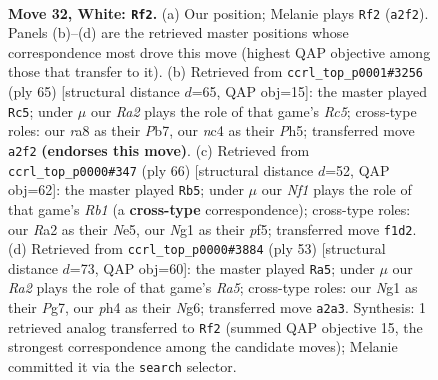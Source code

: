 \documentclass[11pt]{article}
\begin{document}
\clearpage

\begin{figure}[p]\centering
\begin{subfigure}{0.46\textwidth}\centering
\resizebox{\linewidth}{!}{%
\newchessgame
\chessboard[
  setfen={r1b1k3/8/8/1P4r1/p1n1pp1p/3p3P/R5PR/K4NN1 w q - 0 32},
  showmover=false,
  pgfstyle=straightmove, color=movearrow, markmove={a2-f2}
]}
\caption{}
\end{subfigure}\hfill
\begin{subfigure}{0.46\textwidth}\centering
\resizebox{\linewidth}{!}{%
\newchessgame
\chessboard[
  setfen={8/1pk5/3r2p1/p2p2Pp/2r1nP1P/P3R3/1P6/1K1R1B2 b - - 2 33},
  showmover=false,
  pgfstyle=straightmove, color=movearrow, markmove={c4-c5}
]}
\caption{}
\end{subfigure}
\\[4pt]
\begin{subfigure}{0.46\textwidth}\centering
\resizebox{\linewidth}{!}{%
\newchessgame
\chessboard[
  setfen={8/2p1k3/1n6/2p1Np2/r1P3p1/p3P1P1/P3KP1r/1RR5 w - - 0 34},
  showmover=false,
  pgfstyle=straightmove, color=movearrow, markmove={b1-b5}
]}
\caption{}
\end{subfigure}\hfill
\begin{subfigure}{0.46\textwidth}\centering
\resizebox{\linewidth}{!}{%
\newchessgame
\chessboard[
  setfen={5rk1/p5p1/3P2n1/3p4/r6p/2P2NbP/P5P1/K2R2BR b - - 0 27},
  showmover=false,
  pgfstyle=straightmove, color=movearrow, markmove={a4-a5}
]}
\caption{}
\end{subfigure}
\caption{\textbf{Move 32, White: \texttt{Rf2}.} (a) Our position; Melanie plays \texttt{Rf2} (\texttt{a2f2}). Panels (b)--(d) are the retrieved master positions whose correspondence most drove this move (highest QAP objective among those that transfer to it). (b) Retrieved from \texttt{ccrl\_top\_p0001\#3256} (ply 65) [structural distance $d$=65, QAP obj=15]: the master played \texttt{Rc5}; under $\mu$ our \emph{Ra2} plays the role of that game's \emph{Rc5}; cross-type roles: our \emph{r}a8 as their \emph{P}b7, our \emph{n}c4 as their \emph{P}h5; transferred move \texttt{a2f2} \textbf{(endorses this move)}. (c) Retrieved from \texttt{ccrl\_top\_p0000\#347} (ply 66) [structural distance $d$=52, QAP obj=62]: the master played \texttt{Rb5}; under $\mu$ our \emph{Nf1} plays the role of that game's \emph{Rb1} (a \textbf{cross-type} correspondence); cross-type roles: our \emph{R}a2 as their \emph{N}e5, our \emph{N}g1 as their \emph{p}f5; transferred move \texttt{f1d2}. (d) Retrieved from \texttt{ccrl\_top\_p0000\#3884} (ply 53) [structural distance $d$=73, QAP obj=60]: the master played \texttt{Ra5}; under $\mu$ our \emph{Ra2} plays the role of that game's \emph{Ra5}; cross-type roles: our \emph{N}g1 as their \emph{P}g7, our \emph{p}h4 as their \emph{N}g6; transferred move \texttt{a2a3}. Synthesis: 1 retrieved analog transferred to \texttt{Rf2} (summed QAP objective 15, the strongest correspondence among the candidate moves); Melanie committed it via the \texttt{search} selector.}
\label{fig:thought-m62}
\end{figure}
\end{document}
